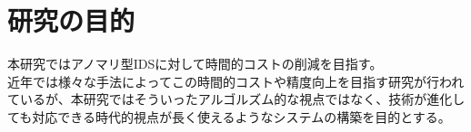 \section{研究の目的}
本研究ではアノマリ型IDSに対して時間的コストの削減を目指す。\\
近年では様々な手法によってこの時間的コストや精度向上を目指す研究が行われているが、本研究ではそういったアルゴルズム的な視点ではなく、技術が進化しても対応できる時代的視点が長く使えるようなシステムの構築を目的とする。\\
